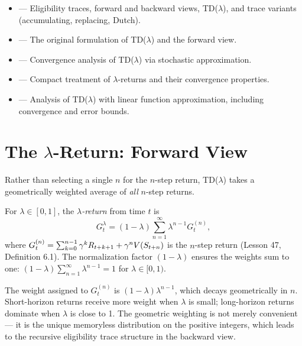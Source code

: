\documentclass[11pt,a4paper]{article}
\begin{document}
\begin{itemize}[leftmargin=2em]
  \item \citet[Chapter 12]{suttonbarto2018} --- Eligibility traces,
    forward and backward views, TD($\lambda$), and trace variants
    (accumulating, replacing, Dutch).
  \item \citet[Section 3]{sutton1988} --- The original formulation of
    TD($\lambda$) and the forward view.
  \item \citet[Chapter 5]{bertsekas1996} --- Convergence analysis of
    TD($\lambda$) via stochastic approximation.
  \item \citet[Section 4.3]{szepesvari2010} --- Compact treatment of
    $\lambda$-returns and their convergence properties.
  \item \citet{tsitsiklis1997} --- Analysis of TD($\lambda$) with
    linear function approximation, including convergence and error
    bounds.
\end{itemize}

\section{The $\lambda$-Return: Forward View}
\label{sec:lambda_return}

Rather than selecting a single $n$ for the $n$-step return, TD($\lambda$)
takes a geometrically weighted average of \emph{all} $n$-step returns.

\begin{definition}
\label{def:lambda_return}
For $\lambda \in [0,1]$, the \emph{$\lambda$-return} from time $t$ is
\begin{equation}
  G_t^\lambda = (1 - \lambda)
  \sum_{n=1}^{\infty} \lambda^{n-1} G_t^{(n)},
  \label{eq:lambda_return}
\end{equation}
where $G_t^{(n)} = \sum_{k=0}^{n-1} \gamma^k R_{t+k+1}
+ \gamma^n V(S_{t+n})$ is the $n$-step return
(Lesson 47, Definition 6.1). The normalization factor $(1 - \lambda)$
ensures the weights sum to one:
$(1 - \lambda)\sum_{n=1}^\infty \lambda^{n-1} = 1$ for
$\lambda \in [0,1)$.
\end{definition}

\begin{remark}
\label{rem:geometric}
The weight assigned to $G_t^{(n)}$ is $(1-\lambda)\lambda^{n-1}$,
which decays geometrically in $n$. Short-horizon returns receive more
weight when $\lambda$ is small; long-horizon returns dominate when
$\lambda$ is close to 1. The geometric weighting is not merely
convenient --- it is the unique memoryless distribution on the positive
integers, which leads to the recursive eligibility trace structure in
the backward view.
\end{remark}
\end{document}
